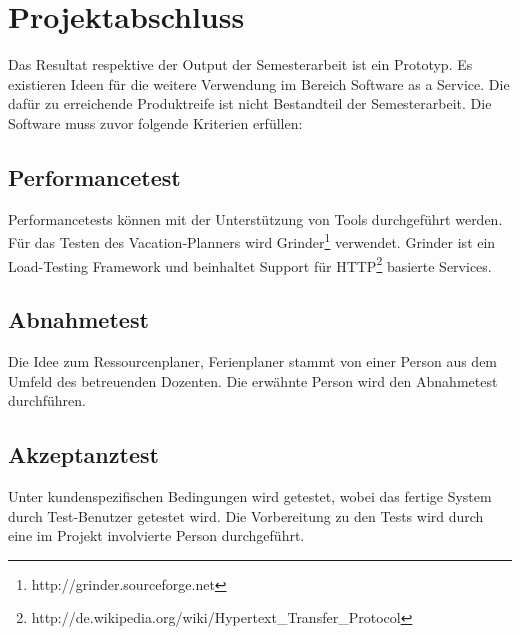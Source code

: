 \chapter{Projektabschluss}
Das Resultat respektive der Output der Semesterarbeit ist ein Prototyp. Es existieren Ideen f\"ur die weitere Verwendung im Bereich Software as a Service. Die daf\"ur zu erreichende Produktreife ist nicht Bestandteil der Semesterarbeit. Die Software muss zuvor folgende Kriterien erf\"ullen:

\section{Performancetest}
Performancetests k\"onnen mit der Unterst\"utzung von Tools durchgef\"uhrt werden. F\"ur das Testen des Vacation-Planners wird Grinder\footnote{http://grinder.sourceforge.net} verwendet. Grinder ist ein Load-Testing Framework und beinhaltet Support f\"ur HTTP\footnote{http://de.wikipedia.org/wiki/Hypertext\_Transfer\_Protocol} basierte Services.


\section{Abnahmetest}
Die Idee zum Ressourcenplaner, Ferienplaner stammt von einer Person aus dem Umfeld des betreuenden Dozenten. Die erw\"ahnte Person wird den Abnahmetest durchf\"uhren.


\section{Akzeptanztest}
Unter kundenspezifischen Bedingungen wird getestet, wobei das fertige System durch Test-Benutzer getestet wird. Die Vorbereitung zu den Tests wird durch eine im Projekt involvierte Person durchgef\"uhrt.

